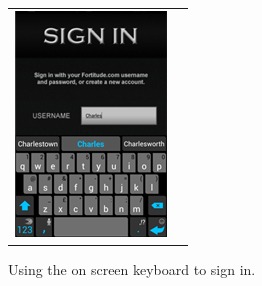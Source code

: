 \begin{figure}[h!]
\begin{tabular}{cc}
\begin{minipage}{0.3\textwidth}
\begin{center}
		\end{center}
	\end{minipage}
	\begin{minipage}{0.3\textwidth}
		\begin{center}
		\begin{minipage}{0.79\textwidth}
		\includegraphics[width=\textwidth]{images/onscreen_keyboard}
		\caption{Using the on screen keyboard to sign in.}
		\label{onscreen_keyboard}
		\end{minipage}
		\end{center}
	\end{minipage}
	\begin{minipage}{0.3\textwidth}
		\begin{center}
		\begin{minipage}{0.83\textwidth}

\end{minipage}
\end{center}
\end{minipage}
\end{tabular}
\end{figure}
